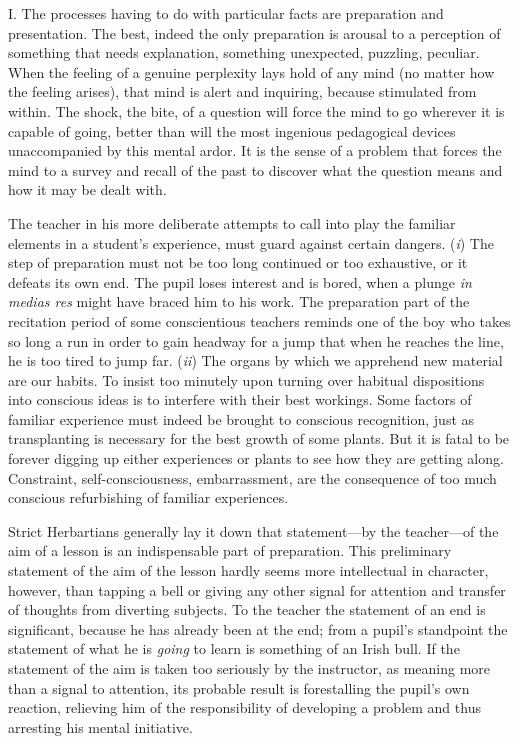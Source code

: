 \documentclass[showtrims,ustradepaper]{memoir}
\begin{document}

I. The processes having to do with particular facts are preparation and
presentation. The best, indeed the only preparation is arousal to a
perception of something that needs explanation, something unexpected,
puzzling, peculiar. When the feeling of a genuine perplexity lays hold
of any mind (no matter how the feeling arises), that mind is alert and
inquiring, because stimulated from within. The shock, the bite, of a
question will force the mind to go wherever it is capable of going,
better than will the most ingenious pedagogical devices unaccompanied by
this mental ardor. It is the sense of a problem that forces the mind to
a survey and recall of the past to discover what the question means and
how it may be dealt with.


The teacher in his more deliberate attempts to call into play the
familiar elements in a student's experience, must guard against certain
dangers. (\emph{i}) The step of preparation must not be too long
continued or too exhaustive, or it defeats its own end. The pupil loses
interest and is bored, when a plunge \emph{in medias res} might have
braced him to his work. The preparation part of the recitation period of
some conscientious teachers reminds one of the boy who takes so long a
run in order to gain headway for a jump that when he reaches the line,
he is too tired to jump far. (\emph{ii}) The organs by which we
apprehend new material are our habits. To insist too minutely upon
turning over habitual dispositions into conscious ideas is to interfere
with their best workings. Some factors of familiar experience must
indeed be brought to conscious recognition, just as
transplanting
is necessary for the best growth of some plants. But it is fatal to be
forever digging up either experiences or plants to see how they are
getting along. Constraint, self-consciousness, embarrassment, are the
consequence of too much conscious refurbishing of familiar experiences.


Strict Herbartians generally lay it down that statement---by the
teacher---of the aim of a lesson is an indispensable part of
preparation. This preliminary statement of the aim of the lesson hardly
seems more intellectual in character, however, than tapping a bell or
giving any other signal for attention and transfer of thoughts from
diverting subjects. To the teacher the statement of an end is
significant, because he has already been at the end; from a pupil's
standpoint the statement of what he is \emph{going} to learn is
something of an Irish bull. If the statement of the aim is taken too
seriously by the instructor, as meaning more than a signal to attention,
its probable result is forestalling the pupil's own reaction, relieving
him of the responsibility of developing a problem and thus arresting his
mental initiative.
\end{document}
